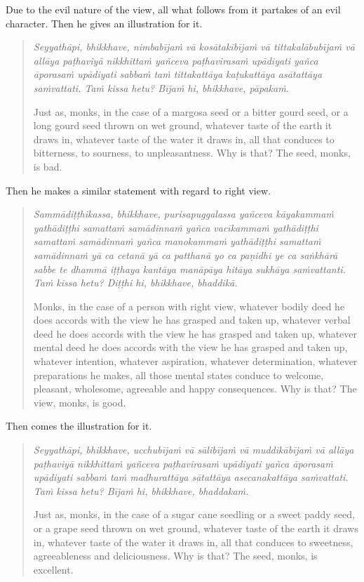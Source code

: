 Due to the evil nature of the view, all what follows from it partakes of an evil character. Then he gives an illustration for it.

\begin{quote}
\emph{Seyyathāpi, bhikkhave, nimbabījaṁ vā kosātakībījaṁ vā tittakalābubījaṁ vā allāya paṭhaviyā nikkhittaṁ yañceva paṭhavirasaṁ upādiyati yañca āporasaṁ upādiyati sabbaṁ taṁ tittakattāya kaṭukattāya asātattāya saṁvattati. Taṁ kissa hetu? Bījaṁ hi, bhikkhave, pāpakaṁ.}

Just as, monks, in the case of a margosa seed or a bitter gourd seed, or a long gourd seed thrown on wet ground, whatever taste of the earth it draws in, whatever taste of the water it draws in, all that conduces to bitterness, to sourness, to unpleasantness. Why is that? The seed, monks, is bad.
\end{quote}

Then he makes a similar statement with regard to right view.

\begin{quote}
\emph{Sammādiṭṭhikassa, bhikkhave, purisapuggalassa yañceva kāyakammaṁ yathādiṭṭhi samattaṁ samādinnaṁ yañca vacīkammaṁ yathādiṭṭhi samattaṁ samādinnaṁ yañca manokammaṁ yathādiṭṭhi samattaṁ samādinnaṁ yā ca cetanā yā ca patthanā yo ca paṇidhi ye ca saṅkhārā sabbe te dhammā iṭṭhaya kantāya manāpāya hitāya sukhāya saṁvattanti. Taṁ kissa hetu? Diṭṭhi hi, bhikkhave, bhaddikā.}

Monks, in the case of a person with right view, whatever bodily deed he does accords with the view he has grasped and taken up, whatever verbal deed he does accords with the view he has grasped and taken up, whatever mental deed he does accords with the view he has grasped and taken up, whatever intention, whatever aspiration, whatever determination, whatever preparations he makes, all those mental states conduce to welcome, pleasant, wholesome, agreeable and happy consequences. Why is that? The view, monks, is good.
\end{quote}

Then comes the illustration for it.

\begin{quote}
\emph{Seyyathāpi, bhikkhave, ucchubījaṁ vā sālibījaṁ vā muddikābījaṁ vā allāya paṭhaviyā nikkhittaṁ yañceva paṭhavirasaṁ upādiyati yañca āporasaṁ upādiyati sabbaṁ taṁ madhurattāya sātattāya asecanakattāya saṁvattati. Taṁ kissa hetu? Bījaṁ hi, bhikkhave, bhaddakaṁ.}

Just as, monks, in the case of a sugar cane seedling or a sweet paddy seed, or a grape seed thrown on wet ground, whatever taste of the earth it draws in, whatever taste of the water it draws in, all that conduces to sweetness, agreeableness and deliciousness. Why is that? The seed, monks, is excellent.
\end{quote}

